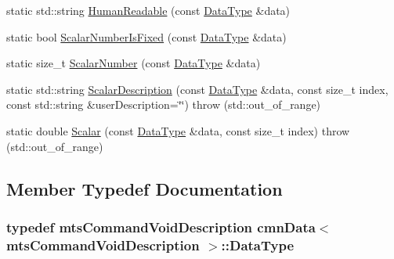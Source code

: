 \begin{DoxyCompactItemize}
\item 
static std\-::string \hyperlink{classcmn_data_3_01mts_command_void_description_01_4_a9b06cc3ee446dbbd56f9023eec0fa928}{Human\-Readable} (const \hyperlink{classcmn_data_3_01mts_command_void_description_01_4_a3e577a0f1b624d67c004609f2145eba4}{Data\-Type} \&data)
\item 
static bool \hyperlink{classcmn_data_3_01mts_command_void_description_01_4_a836696a65a1a970709c13815f45b9ea1}{Scalar\-Number\-Is\-Fixed} (const \hyperlink{classcmn_data_3_01mts_command_void_description_01_4_a3e577a0f1b624d67c004609f2145eba4}{Data\-Type} \&data)
\item 
static size\-\_\-t \hyperlink{classcmn_data_3_01mts_command_void_description_01_4_a214b1c237370c8bd701f9514fbbc0b03}{Scalar\-Number} (const \hyperlink{classcmn_data_3_01mts_command_void_description_01_4_a3e577a0f1b624d67c004609f2145eba4}{Data\-Type} \&data)
\item 
static std\-::string \hyperlink{classcmn_data_3_01mts_command_void_description_01_4_a834fc6421ec7514a6456d203599a2024}{Scalar\-Description} (const \hyperlink{classcmn_data_3_01mts_command_void_description_01_4_a3e577a0f1b624d67c004609f2145eba4}{Data\-Type} \&data, const size\-\_\-t index, const std\-::string \&user\-Description=\char`\"{}\char`\"{})  throw (std\-::out\-\_\-of\-\_\-range)
\item 
static double \hyperlink{classcmn_data_3_01mts_command_void_description_01_4_a6f82e68e00acb4a7f3afd2bf9214dd6f}{Scalar} (const \hyperlink{classcmn_data_3_01mts_command_void_description_01_4_a3e577a0f1b624d67c004609f2145eba4}{Data\-Type} \&data, const size\-\_\-t index)  throw (std\-::out\-\_\-of\-\_\-range)
\end{DoxyCompactItemize}


\subsection{Member Typedef Documentation}
\hypertarget{classcmn_data_3_01mts_command_void_description_01_4_a3e577a0f1b624d67c004609f2145eba4}{
\subsubsection[{Data\-Type}]{\setlength{\rightskip}{0pt plus 5cm}typedef {\bf mts\-Command\-Void\-Description} {\bf cmn\-Data}$<$ {\bf mts\-Command\-Void\-Description} $>$\-::{\bf Data\-Type}}}\label{classcmn_data_3_01mts_command_void_description_01_4_a3e577a0f1b624d67c004609f2145eba4}


